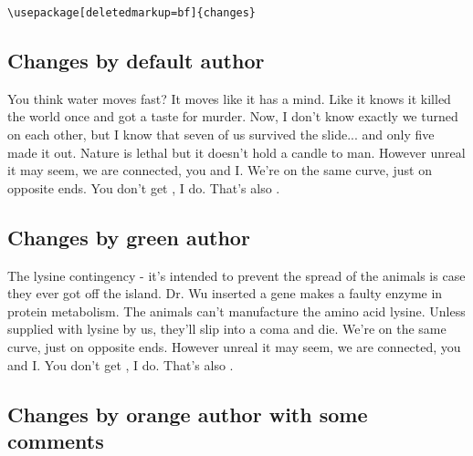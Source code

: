 \documentclass[11pt, a4paper, notitlepage, english]{article}
\begin{document}
\verb|\usepackage[deletedmarkup=bf]{changes}|


















\subsection*{Changes by default author}

You think water moves fast?
It moves like it has a mind.
Like it knows it killed the world once and got a taste for murder.
Now, I don't know exactly  we turned on each other, but I know that seven of us survived the slide... and only five made it out.
Nature is lethal but it doesn't hold a candle to man.
However unreal it may seem, we are connected, you and I.
We're on the same curve, just on opposite ends.
You don't get , I do.
That's also .

\subsection*{Changes by green author}

The lysine contingency - it's intended to prevent the spread of the animals is case they ever got off the island.
Dr. Wu inserted a gene  makes a  faulty enzyme in protein metabolism.
The animals can't manufacture the amino acid lysine.
Unless  supplied with lysine by us, they'll slip into a coma and die.
We're on the same curve, just on opposite ends.
However unreal it may seem, we are connected, you and I.
You don't get , I do.
That's also .

\subsection*{Changes by orange author with some comments}
\end{document}
